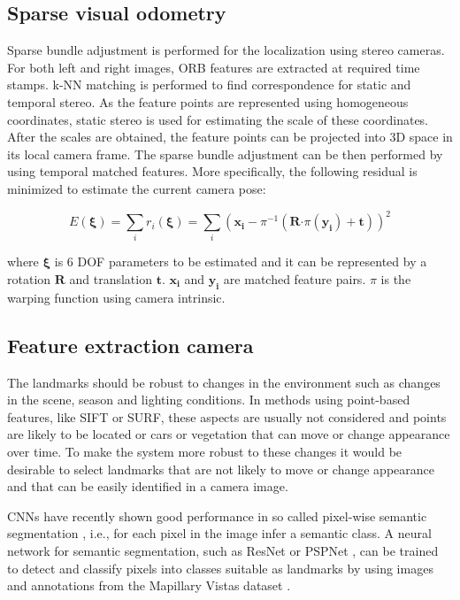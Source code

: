 \subsection{Sparse visual odometry}

Sparse bundle adjustment is performed for the localization using
stereo cameras. For both left and right images, \gls{ORB} features are
extracted at required time stamps. \gls{k-NN} matching
is performed to find correspondence for static and temporal stereo. As
the feature points are represented using homogeneous coordinates,
static stereo is used for estimating the scale of these
coordinates. After the scales are obtained, the feature points can be
projected into 3D space in its local camera frame. The sparse bundle
adjustment can be then performed by using temporal matched
features. More specifically, the following residual is minimized to
estimate the current camera pose:


\begin{equation} \label{eq:pnp}
  E (\bm{\xi}) = \sum_i r_i(\bm{\xi}) = \sum_i ( \bm{x_i} - \pi^{-1}( \mathbf{R} \mathbf{\cdot} \pi(\bm{y_i}) + \mathbf{t}))^2
\end{equation}

where $\bm{\xi}$ is 6 \gls{DOF} parameters to be estimated and it can be
represented by a rotation $\mathbf{R}$ and translation
$\mathbf{t}$. $\bm{x_i}$ and $\bm{y_i}$ are matched feature
pairs. $\pi$ is the warping function using camera intrinsic.

\subsection{Feature extraction camera}
The landmarks should be robust to changes in the environment such as changes in the scene, season and lighting conditions. In methods using point-based features, like \gls{SIFT} or \gls{SURF}, these aspects are usually not considered and points are likely to be located or cars or vegetation that can move or change appearance over time. To make the system more robust to these changes it would be desirable to select landmarks that are not likely to move or change appearance and that can be easily identified in a camera image.

\Glspl{CNN} have recently shown good performance in so called pixel-wise semantic segmentation \cite{cordts2016cityscapes}, i.e., for each pixel in the image infer a semantic class. A neural network for semantic segmentation, such as ResNet \cite{DBLP:journals/corr/WuSH16e} or PSPNet \cite{zhao2017pspnet}, can be trained to detect and classify pixels into classes suitable as landmarks by using images and annotations from the Mapillary Vistas dataset \cite{neuhold2017mapillary}.

